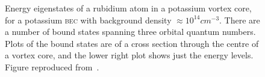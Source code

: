 \begin{figure}
\centering
\noindent{}
\noindent{}
\caption{Energy eigenstates of a rubidium atom in a potassium vortex core, for a potassium \textsc{bec} with background density $\approx 10^{14}\unit{cm}^{-3}$. There are a number of bound states spanning three orbital quantum numbers. Plots of the bound states are of a cross section through the centre of a vortex core, and the lower right plot shows just the energy levels. Figure reproduced from~\cite{billington_particle_2010}.}%
\label{fig:levels1e14}%
\end{figure}

